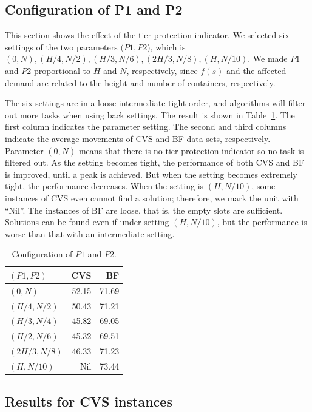 \documentclass[review,3p,times,12pt,number]{elsarticle}\usepackage{amsmath}\usepackage{amssymb}
\begin{document}
\subsection{Configuration of P1 and P2}
This section shows the effect of the tier-protection indicator. We selected six settings of the two parameters $(P1,P2$), which is $(0,N), (H/4,N/2), (H/3,N/6), (2H/3,N/8), (H,N/10)$. We made $P1$ and $P2$ proportional to $H$ and $N$, respectively, since $f(s)$  and the affected demand are related to the height and number of containers, respectively.

The six settings are in a loose-intermediate-tight order, and algorithms will filter out more tasks when using back settings. The result is shown in Table~\ref{tab:tier-protection}.
The first column indicates the parameter setting. The second and third columns indicate the average movements of CVS and BF data sets, respectively.
Parameter $(0,N)$ means that there is no tier-protection indicator so no task is filtered out. As the setting becomes tight, the performance of both CVS and BF is improved, until a peak is achieved. But when the setting becomes extremely tight, the performance decreases. When the setting is $(H,N/10)$, some instances of CVS even cannot find a solution; therefore, we mark the unit with ``Nil''. The instances of BF are loose, that is, the empty slots are sufficient. Solutions can be found even if under setting $(H,N/10)$, but the performance is worse than that with an intermediate setting.
\begin{table}[htbp]
  \centering
  \caption{Configuration of $P1$ and $P2$.}
    \begin{tabular}{lrr}
    \toprule
    $(P1,P2)$ & CVS   & BF \\
    \midrule
    $(0,N)$   & 52.15 & 71.69 \\
    $(H/4,N/2)$ & 50.43 & 71.21 \\
    $(H/3,N/4)$ & 45.82 & 69.05 \\
    $(H/2,N/6)$ & 45.32 & 69.51 \\
    $(2H/3,N/8)$ & 46.33 & 71.23 \\
    $(H,N/10)$ & Nil   & 73.44 \\
    \bottomrule
    \end{tabular}
  \label{tab:tier-protection}
\end{table}



\subsection{Results for CVS instances}
\end{document}
